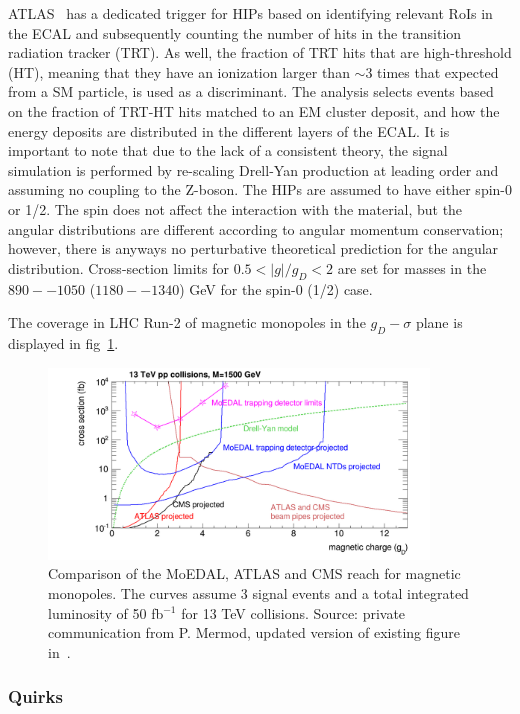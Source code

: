 ATLAS~\cite{Aad:2015kta}  has a dedicated trigger for HIPs based on identifying relevant RoIs in the ECAL and subsequently counting the number of hits in the transition radiation tracker (TRT). As well, the fraction of TRT hits that are high-threshold (HT), meaning that they have an ionization larger than $\sim3$ times that expected from a SM particle, is used as a discriminant. The analysis selects events based on the fraction of TRT-HT hits matched to an EM cluster deposit, and how the energy deposits are distributed in the different layers of the ECAL. It is important to note that due to the lack of a consistent theory, the signal simulation is performed by re-scaling Drell-Yan production at leading order and assuming no coupling to the Z-boson. The HIPs are assumed to have either spin-0 or 1/2. The spin does not affect the interaction with the material, but the angular distributions are different according to angular momentum conservation; however, there is anyways no perturbative theoretical prediction for the angular distribution. Cross-section limits for $0.5 < |g|/g_D < 2$ are set for masses in the $890--1050$ ($1180--1340$) GeV for the spin-0 (1/2) case.

The coverage in LHC Run-2 of magnetic monopoles in the $g_D-\sigma$ plane is displayed in fig~\ref{fig:magnetic_monopole_reach}.
\begin{figure}[htb]
\centering
\includegraphics[width=0.9\textwidth]{plots/monopoles_xsec_13TeV_3events}
\caption{Comparison of the MoEDAL, ATLAS and CMS reach for magnetic monopoles. The curves assume 3 signal events and a total integrated luminosity of 50 fb$^{-1}$ for 13 TeV collisions. Source: private communication from P. Mermod, updated version of existing figure in~\cite{DeRoeck:2011aa}.}
\label{fig:magnetic_monopole_reach}
\end{figure}

\subsubsection{Quirks}

